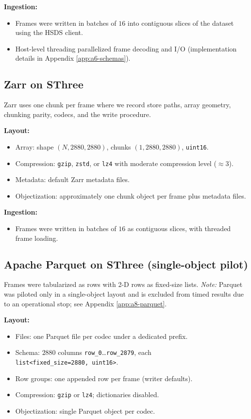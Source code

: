 \documentclass[nomenclature, english, bibtex]{kththesis}
\numberwithin{listing}{chapter}
\begin{document}
\textbf{Ingestion:}
\begin{itemize}
  \item Frames were written in batches of $16$ into contiguous slices of the dataset using the \gls{HSDS} client.
  \item Host-level threading parallelized frame decoding and I/O (implementation details in Appendix \ref{app:a6-schemas}).
\end{itemize}

\subsection{Zarr on \texorpdfstring{\gls{SThree}}{S3}} Zarr uses one chunk per frame where we record store paths, array geometry, chunking parity, codecs, and the write procedure.

\textbf{Layout:}
\begin{itemize}
  \item Array: shape $(N,2880,2880)$, chunks $(1,2880,2880)$, \texttt{uint16}.
  \item Compression: \texttt{gzip}, \texttt{zstd}, or \texttt{lz4} with moderate compression level ($\approx 3$).
  \item Metadata: default Zarr metadata files.
  \item Objectization: approximately one chunk object per frame plus metadata files.
\end{itemize}

\textbf{Ingestion:}
\begin{itemize}
  \item Frames were written in batches of $16$ as contiguous slices, with threaded frame loading.
\end{itemize}

\subsection{Apache Parquet on \texorpdfstring{\gls{SThree}}{S3} (single-object pilot)} Frames were tabularized as rows with 2-D rows as fixed-size lists. \textit{Note:} Parquet was piloted only in a single-object layout and is excluded from timed results due to an operational stop; see Appendix \ref{app:a8-parquet}.

\textbf{Layout:}
\begin{itemize}
  \item Files: one Parquet file per codec under a dedicated prefix.
  \item Schema: $2880$ columns \texttt{row\_0}\dots\texttt{row\_2879}, each \\ \texttt{list<fixed\_size=2880, uint16>}.
  \item Row groups: one appended row per frame (writer defaults).
  \item Compression: \texttt{gzip} or \texttt{lz4}; dictionaries disabled.
  \item Objectization: single Parquet object per codec.
\end{itemize}
\end{document}
